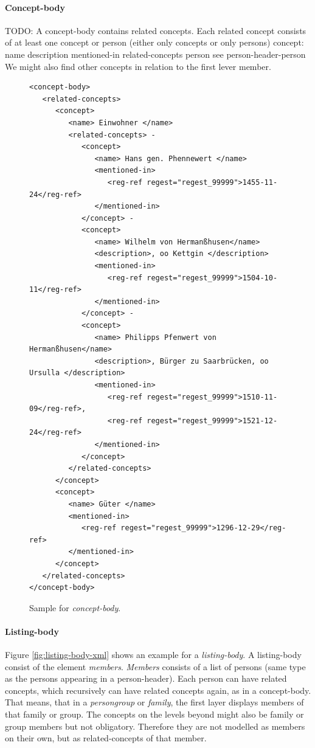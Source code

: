 \paragraph{Concept-body}
TODO: A concept-body contains related concepts. Each related concept consists of at least one concept or person (either only concepts or only persons)
concept:
name
description
mentioned-in
related-concepts
person
see person-header-person
We might also find other concepts in relation to the first lever member.
\begin{figure}[H]
\begin{verbatim}
<concept-body>
   <related-concepts>
      <concept>
         <name> Einwohner </name>
         <related-concepts> -
            <concept>
               <name> Hans gen. Phennewert </name>
               <mentioned-in>
                  <reg-ref regest="regest_99999">1455-11-24</reg-ref>
               </mentioned-in>
            </concept> -
            <concept>
               <name> Wilhelm von Hermanßhusen</name>
               <description>, oo Kettgin </description>
               <mentioned-in>
                  <reg-ref regest="regest_99999">1504-10-11</reg-ref>
               </mentioned-in>
            </concept> -
            <concept>
               <name> Philipps Pfenwert von Hermanßhusen</name>
               <description>, Bürger zu Saarbrücken, oo Ursulla </description>
               <mentioned-in>
                  <reg-ref regest="regest_99999">1510-11-09</reg-ref>, 
                  <reg-ref regest="regest_99999">1521-12-24</reg-ref>
               </mentioned-in>
            </concept>
         </related-concepts>
      </concept>
      <concept>
         <name> Güter </name>
         <mentioned-in>
            <reg-ref regest="regest_99999">1296-12-29</reg-ref>
         </mentioned-in>
      </concept>
   </related-concepts>
</concept-body>
\end{verbatim}
\label{fig:concept-body-xml}
\caption{Sample for \textit{concept-body}.}
\end{figure}

\paragraph{Listing-body}
Figure \ref{fig:listing-body-xml} shows an example for a \textit{listing-body}. A listing-body consist of the element \textit{members}. \textit{Members} consists of a list of persons (same type as the persons appearing in a person-header). Each person can have related concepts, which recursively can have related concepts again, as in a concept-body.
That means, that in a \textit{persongroup} or \textit{family}, the first layer displays members of that family or group. The concepts on the levels beyond might also be family or group members but not obligatory. Therefore they are not modelled as members on their own, but as related-concepts of that member.

